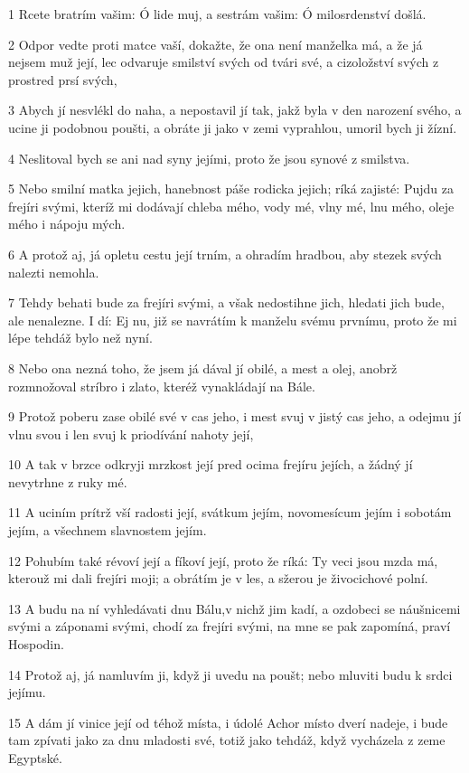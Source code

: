 \par 1 Rcete bratrím vašim: Ó lide muj, a sestrám vašim: Ó milosrdenství došlá.
\par 2 Odpor vedte proti matce vaší, dokažte, že ona není manželka má, a že já nejsem muž její, lec odvaruje smilství svých od tvári své, a cizoložství svých z prostred prsí svých,
\par 3 Abych jí nesvlékl do naha, a nepostavil jí tak, jakž byla v den narození svého, a ucine ji podobnou poušti, a obráte ji jako v zemi vyprahlou, umoril bych ji žízní.
\par 4 Neslitoval bych se ani nad syny jejími, proto že jsou synové z smilstva.
\par 5 Nebo smilní matka jejich, hanebnost páše rodicka jejich; ríká zajisté: Pujdu za frejíri svými, kteríž mi dodávají chleba mého, vody mé, vlny mé, lnu mého, oleje mého i nápoju mých.
\par 6 A protož aj, já opletu cestu její trním, a ohradím hradbou, aby stezek svých nalezti nemohla.
\par 7 Tehdy behati bude za frejíri svými, a však nedostihne jich, hledati jich bude, ale nenalezne. I dí: Ej nu, již se navrátím k manželu svému prvnímu, proto že mi lépe tehdáž bylo než nyní.
\par 8 Nebo ona nezná toho, že jsem já dával jí obilé, a mest a olej, anobrž rozmnožoval stríbro i zlato, kteréž vynakládají na Bále.
\par 9 Protož poberu zase obilé své v cas jeho, i mest svuj v jistý cas jeho, a odejmu jí vlnu svou i len svuj k priodívání nahoty její,
\par 10 A tak v brzce odkryji mrzkost její pred ocima frejíru jejích, a žádný jí nevytrhne z ruky mé.
\par 11 A uciním prítrž vší radosti její, svátkum jejím, novomesícum jejím i sobotám jejím, a všechnem slavnostem jejím.
\par 12 Pohubím také révoví její a fíkoví její, proto že ríká: Ty veci jsou mzda má, kterouž mi dali frejíri moji; a obrátím je v les, a sžerou je živocichové polní.
\par 13 A budu na ní vyhledávati dnu Bálu,v nichž jim kadí, a ozdobeci se náušnicemi svými a záponami svými, chodí za frejíri svými, na mne se pak zapomíná, praví Hospodin.
\par 14 Protož aj, já namluvím ji, když ji uvedu na poušt; nebo mluviti budu k srdci jejímu.
\par 15 A dám jí vinice její od téhož místa, i údolé Achor místo dverí nadeje, i bude tam zpívati jako za dnu mladosti své, totiž jako tehdáž, když vycházela z zeme Egyptské.

